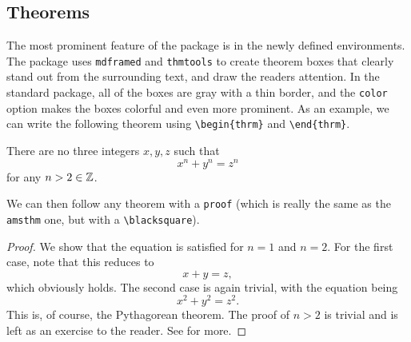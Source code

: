 \documentclass[11pt]{article}
\begin{document}
\subsection{Theorems}
The most prominent feature of the package is in the newly defined environments. The package uses \texttt{mdframed} and \texttt{thmtools} to create theorem boxes that clearly stand out from the surrounding text, and draw the readers attention. In the standard package, all of the boxes are gray with a thin border, and the \texttt{color} option makes the boxes colorful and even more prominent. As an example, we can write the following theorem using \verb|\begin{thrm}| and \verb|\end{thrm}|.
\begin{thrm}
	There are no three integers $x,y,z$ such that
	\[x^n + y^n = z^n\]
	for any $n > 2 \in \mathbb{Z}$.
\end{thrm}
We can then follow any theorem with a \verb|proof| (which is really the same as the \texttt{amsthm} one, but with a \verb|\blacksquare|).

\begin{proof}
	We show that the equation is satisfied for $n = 1$ and $n = 2$. For the first case, note that this reduces to
	\[x + y = z,\]
	which obviously holds. The second case is again trivial, with the equation being
	\[x^2 + y^2 = z^2.\]
	This is, of course, the Pythagorean theorem. The proof of $n > 2$ is trivial and is left as an exercise to the reader. See \cite{wiles1995} for more.
\end{proof}
\end{document}
